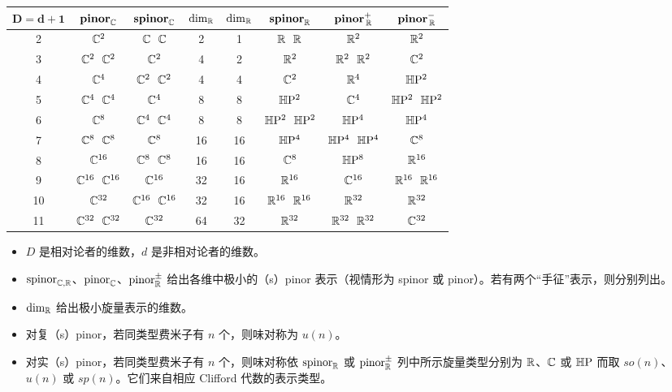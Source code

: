 \begin{center}
\small
\setlength{\tabcolsep}{3pt}
\renewcommand{\arraystretch}{0.95}
\begin{tabular}{c||c|c|c||c|c|c|c|}
\hline
$\boldsymbol{D=d+1}$ & $\mathbf{pinor}_{\mathbb{C}}$ & $\mathbf{spinor}_{\mathbb{C}}$
  & $\dim_{\mathbb{R}}$ & $\dim_{\mathbb{R}}$ & $\mathbf{spinor}_{\mathbb{R}}$
  & $\mathbf{pinor}^{+}_{\,\mathbb{R}}$ & $\mathbf{pinor}^{-}_{\,\mathbb{R}}$\\
\hline
2 & $\mathbb{C}^2$ & $\C\ \ \C$ & 2 & 1 & $\R\ \ \R$ & $\mathbb{R}^2$ & $\mathbb{R}^2$\\
3 & $\C^2\ \ \C^2$ & $\mathbb{C}^2$ & 4 & 2 & $\mathbb{R}^2$ & $\R^2\ \ \R^2$ & $\mathbb{C}^2$\\
4 & $\mathbb{C}^4$ & $\C^2\ \ \C^2$ & 4 & 4 & $\mathbb{C}^2$ & $\mathbb{R}^4$ & $\mathbb{H}\mathrm{P}^2$\\
5 & $\C^4\ \ \C^4$ & $\mathbb{C}^4$ & 8 & 8 & $\mathbb{H}\mathrm{P}^2$ & $\mathbb{C}^4$ & $\HP^2\ \ \HP^2$\\
6 & $\mathbb{C}^8$ & $\C^4\ \ \C^4$ & 8 & 8 & $\HP^2\ \ \HP^2$ & $\mathbb{H}\mathrm{P}^4$ & $\mathbb{H}\mathrm{P}^4$\\
7 & $\C^8\ \ \C^8$ & $\mathbb{C}^8$ & 16 & 16 & $\mathbb{H}\mathrm{P}^4$ & $\HP^4\ \ \HP^4$ & $\mathbb{C}^8$\\
8 & $\mathbb{C}^{16}$ & $\C^8\ \ \C^8$ & 16 & 16 & $\mathbb{C}^8$ & $\mathbb{H}\mathrm{P}^8$ & $\mathbb{R}^{16}$\\
9 & $\C^{16}\ \ \C^{16}$ & $\mathbb{C}^{16}$ & 32 & 16 & $\mathbb{R}^{16}$ & $\mathbb{C}^{16}$ & $\R^{16}\ \ \R^{16}$\\
10 & $\mathbb{C}^{32}$ & $\C^{16}\ \ \C^{16}$ & 32 & 16 & $\R^{16}\ \ \R^{16}$ & $\mathbb{R}^{32}$ & $\mathbb{R}^{32}$\\
11 & $\C^{32}\ \ \C^{32}$ & $\mathbb{C}^{32}$ & 64 & 32 & $\mathbb{R}^{32}$ & $\R^{32}\ \ \R^{32}$ & $\mathbb{C}^{32}$\\
\hline
\end{tabular}
\end{center}

\begin{itemize}[leftmargin=1.6em,itemsep=1pt,topsep=2pt]
\item $D$ 是相对论者的维数，$d$ 是非相对论者的维数。
\item $\mathrm{spinor}_{\mathbb{C},\mathbb{R}}$、$\mathrm{pinor}_{\mathbb{C}}$、$\mathrm{pinor}^{\pm}_{\mathbb{R}}$ 给出各维中极小的（s）pinor 表示（视情形为 spinor 或 pinor）。若有两个“手征”表示，则分别列出。
\item $\dim_{\mathbb{R}}$ 给出极小旋量表示的维数。
\item 对复（s）pinor，若同类型费米子有 $n$ 个，则味对称为 $u(n)$。
\item 对实（s）pinor，若同类型费米子有 $n$ 个，则味对称依 $\mathrm{spinor}_{\mathbb{R}}$ 或 $\mathrm{pinor}^{\pm}_{\mathbb{R}}$ 列中所示旋量类型分别为 $\mathbb{R}$、$\mathbb{C}$ 或 $\mathbb{H}\mathrm{P}$ 而取 $so(n)$、$u(n)$ 或 $sp(n)$。它们来自相应 Clifford 代数的表示类型。
\end{itemize}

